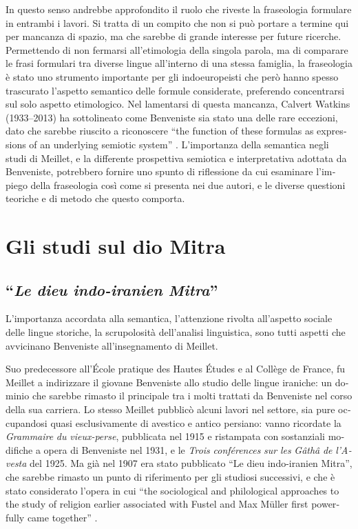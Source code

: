 \documentclass[output=paper]{../langscibook}
\begin{document}
\begin{otherlanguage}{italian}
In questo senso andrebbe approfondito il ruolo che riveste la fraseologia formulare in entrambi i lavori. Si tratta di un compito che non si può portare a termine qui per mancanza di spazio, ma che sarebbe di grande interesse per future ricerche.
Permettendo di non fermarsi all’etimologia della singola parola, ma di comparare le frasi formulari tra diverse lingue all’interno di una stessa famiglia, la fraseologia è stato uno strumento importante per gli indoeuropeisti che però hanno spesso trascurato l’aspetto semantico delle formule considerate, preferendo concentrarsi sul solo aspetto etimologico.  Nel lamentarsi di questa mancanza, Calvert Watkins (1933--2013) ha sottolineato come Benveniste sia stato una delle rare eccezioni, dato che sarebbe riuscito a riconoscere “the function of these formulas as expressions of an underlying semiotic system” \citep[43]{watkins_how_1995}. L’importanza della semantica negli studi di Meillet, e la differente prospettiva semiotica e interpretativa adottata da Benveniste, potrebbero fornire uno spunto di riflessione da cui esaminare l’impiego della fraseologia così come si presenta nei due autori, e le diverse questioni teoriche e di metodo che questo comporta.

\section{Gli studi sul dio Mitra}

\subsection{“\textit{Le dieu indo-iranien Mitra}”}

L’importanza accordata alla semantica, l’attenzione rivolta all’aspetto sociale delle lingue storiche, la scrupolosità dell’analisi linguistica, sono tutti aspetti che avvicinano Benveniste all’insegnamento di Meillet.

Suo predecessore all’École pratique des Hautes Études e al Collège de France, fu Meillet a indirizzare il giovane Benveniste allo studio delle lingue iraniche: un dominio che sarebbe rimasto il principale tra i molti trattati da Benveniste nel corso della sua carriera. Lo stesso Meillet pubblicò alcuni lavori nel settore, sia pure occupandosi quasi esclusivamente di avestico e antico persiano: vanno ricordate la \textit{Grammaire} \textit{du} \textit{vieux{}-perse}, pubblicata nel 1915 e ristampata con sostanziali modifiche a opera di Benveniste nel 1931, e le \textit{Trois} \textit{conférences} \textit{sur} \textit{les} \textit{Gâthâ} \textit{de} \textit{l’Avesta} del 1925. Ma già nel 1907 era stato pubblicato “Le dieu indo-iranien Mitra”, che sarebbe rimasto un punto di riferimento per gli studiosi successivi, e che è stato considerato l’opera in cui “the sociological and philological approaches to the study of religion earlier associated with Fustel and Max Müller first powerfully came together” \citep[13]{lincoln_oaths_2012}.


\end{otherlanguage}
\end{document}

